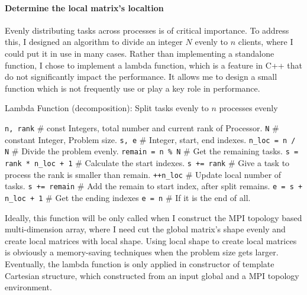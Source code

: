 \paragraph{Determine the local matrix's localtion}
Evenly distributing tasks across processes is of critical importance.
To address this, I designed an algorithm to divide an integer $N$ evenly to $n$ clients, where I could put it in use in 
many cases.
Rather than implementing a standalone function, I chose to implement a lambda function, which is a feature in C++ that do not significantly 
impact the performance.
It allows me to design a small function which is not frequently use or play a key role in performance.
\begin{algorithm}
  \caption{Lambda Function (decomposition): Split tasks evenly to $n$ processes evenly}
  \begin{algorithmic}[1]
    \STATE \texttt{n, rank} \hfill \# const Integers, total number and current rank of Processor.
    \STATE \texttt{N} \hfill \# constant Integer, Problem size.
    \STATE \texttt{s, e} \hfill \# Integer, start, end indexes.
    \STATE \texttt{n\_loc = n / N} \hfill \# Divide the problem evenly.
    \STATE \texttt{remain = n \% N} \hfill \# Get the remaining tasks.
    \STATE \texttt{s = rank * n\_loc + 1} \hfill \# Calculate the start indexes.
      \STATE \texttt{s += rank}      \hfill \# Give a task to process the rank is smaller than remain.
      \STATE \texttt{++n\_loc}       \hfill \# Update local number of tasks.
    \ELSE 
      \STATE \texttt{s += remain}   \hfill \# Add the remain to start index, after split remains.
    \ENDIF
    \STATE \texttt{e = s + n\_loc + 1}  \hfill \# Get the ending indexes
      \STATE \texttt{e = n}           \hfill \# If it is the end of all.
    \ENDIF
  \end{algorithmic}
\end{algorithm}
Ideally, this function will be only called when I construct the MPI topology based multi-dimension array, where I 
need cut the global matrix's shape evenly and create local matrices with local shape.
Using local shape to create local matrices is obviously a memory-saving techniques when the problem size gets larger.
Eventually, the lambda function is only applied in constructor of template Cartesian structure, which constructed from 
an input global and a MPI topology environment. 

